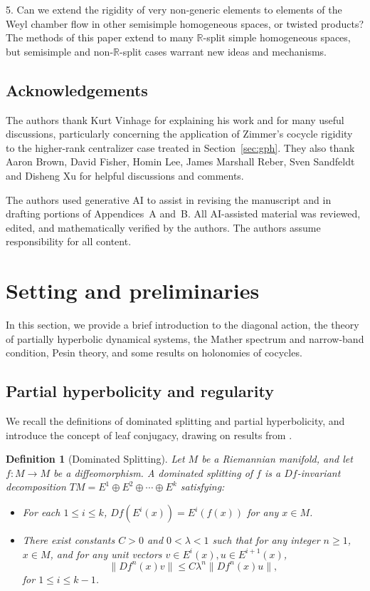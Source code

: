 \documentclass[11pt]{amsart}
\numberwithin{equation}{section}
\newcommand{\R}{\mathbb{R}}
\theoremstyle{plain}
\newtheorem{defi}{Definition}[section]
\begin{document}
5. Can we extend the rigidity of very non-generic elements to elements of the Weyl chamber flow in other semisimple homogeneous spaces, or twisted products? The methods of this paper extend to many $\R$-split simple homogeneous spaces, but semisimple and non-$\R$-split cases warrant new ideas and mechanisms.


\subsection{Acknowledgements}

The authors thank Kurt Vinhage for explaining his work and for many
useful discussions, particularly concerning the application of Zimmer's
cocycle rigidity to the higher-rank centralizer case treated in
Section~\ref{sec:gph}. They also thank Aaron Brown, David Fisher,
Homin Lee, James Marshall Reber, Sven Sandfeldt and Disheng Xu for
helpful discussions and comments.

The authors used generative AI to assist in revising
the manuscript and in drafting portions of Appendices~A and~B.
All AI-assisted material was reviewed, edited, and mathematically
verified by the authors. The authors assume responsibility for all
content.

\section{Setting and preliminaries}\label{prelim}
In this section, we provide a brief introduction to the diagonal action, the theory of partially hyperbolic dynamical systems, the Mather spectrum and narrow-band condition, Pesin theory, and some results on holonomies of cocycles.



\subsection{Partial hyperbolicity and regularity}\label{prel:ph}
We recall the definitions of dominated splitting and partial hyperbolicity, and introduce the concept of leaf conjugacy, drawing on results from \cite{HPS}.

\begin{defi}[Dominated Splitting]
Let $M$ be a Riemannian manifold, and let $f:M\to M$ be a diffeomorphism. A \emph{dominated splitting} of $f$ is a $Df$-invariant decomposition $TM=E^1\oplus E^2\oplus \cdots \oplus E^k$ satisfying:
\begin{itemize}
\item For each $1\le i\le k$, $Df(E^i(x))=E^i(f(x))$ for any $x\in M$.
\item There exist constants $C>0$ and $0 < \lambda < 1$ such that for any integer $n \ge 1$, $x\in M$, and for any unit vectors $v\in E^i(x), u\in E^{i+1}(x)$,
$$
\|Df^n(x)v\|\le C\lambda^n \|Df^n(x)u\|,
$$
for $1\le i\le k-1$.
\end{itemize}
\end{defi}
\end{document}
